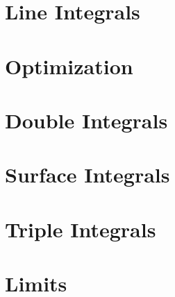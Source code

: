 \documentclass[letterpaper,oneside]{book}%
\newcommand{\wrapup}{
\bmw{\section{Wrap Up}
Once you have finished the problems in the section and feel comfortable with the ideas, create a short one page lesson plan that contains examples of the key ideas.  You will get a chance to teach from this lesson plan prior to taking the exam. Then log on to Brainhoney and download the quiz. Once you have taken the quiz, you can upload your work back to brainhoney and then download the key to see how you did. If you still need to work on mastering some of the ideas, please do so and then demonstrate your mastery though the quiz corrections.}

\valpo{\section{Wrap Up}
This concludes the chapter.  Look at the objectives at the beginning of the chapter. Can you now do all the things you were promised? \\
\textbf{Lesson Plan Creation\\}
Your assignment: organize what you've learned into a small collection of examples that illustrates the key concepts. I'll call this your one-page lesson plan. You may use both sides. The objectives at the beginning of the chapter give you a list of the key concepts. Once you finish your lesson plan, scan it into a PDF document (use any scanner on campus), and then upload the document to Blackboard.

As you create this lesson plan, consider the following:
\begin{itemize}
 \item On the class period after making this plan, you'll have 20 minutes in class where you will get to teach a peer your examples. If you keep the examples simple, you'll be able to fully review the entire chapter.
 \item Before each Celebration of Knowledge \instructor{This is just an exam} we will devote a class period to review. With well created lesson plans, you will have 4-8 pages(for 2-4 Chapters) to review for each, instead of 50-100 problems.
 \item Think ahead 2-5 years. If you make these lesson plans correctly, you'll be able to look back at your lesson plans for this semester. In about 10 pages, you can have the entire course summarized and easy for you to recall.
\end{itemize}
} %
} %
\let\oldmarginpar\marginpar
\renewcommand\marginpar[1]{\-\oldmarginpar{\raggedright\footnotesize #1}}
\newcommand{\instructor}[1]{\marginpar{\textcolor{blue}{\textbf{Instructor: }#1}}}
\newcommand{\instructor}[1]{}
\newcommand{\bmw}[1]{#1}
\newcommand{\bmw}[1]{}
\newcommand{\valpo}[1]{\textbf{To Valpo Students:} #1}
\newcommand{\valpo}[1]{}
\theoremstyle{plain}
\theoremstyle{box}
\theoremstyle{problem}
\begin{document}
\chapter{Line Integrals}
\minitoc \mtcskip

%
%
%
\chapter{Optimization}
\minitoc \mtcskip

%
%
\chapter{Double Integrals}
\minitoc \mtcskip

%
%
%
\chapter{Surface Integrals}
\minitoc \mtcskip

%
\chapter{Triple Integrals}
\minitoc \mtcskip


\chapter{Limits}
\minitoc \mtcskip

\end{document}
